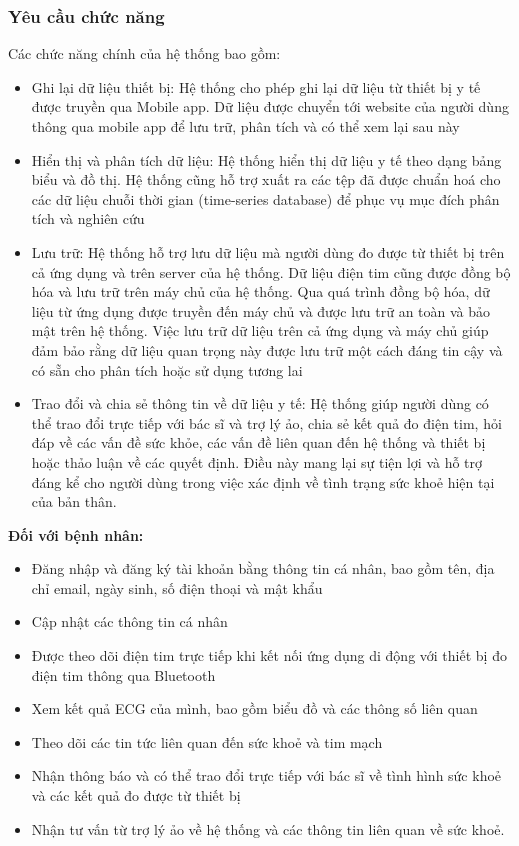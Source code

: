 \subsubsection{Yêu cầu chức năng}
Các chức năng chính của hệ thống bao gồm:
\begin{adjustwidth}{1.5em}{}
  \begin{itemize}
      \item Ghi lại dữ liệu thiết bị: Hệ thống cho phép ghi lại dữ liệu từ thiết bị y tế được truyền qua Mobile app. Dữ liệu được chuyển tới website của người dùng thông qua mobile app để lưu trữ, phân tích và có thể xem lại sau này
      \item Hiển thị và phân tích dữ liệu: Hệ thống hiển thị dữ liệu y tế theo dạng bảng biểu và đồ thị. Hệ thống cũng hỗ trợ xuất ra các tệp đã được chuẩn hoá cho các dữ liệu chuỗi thời gian (time-series database) để phục vụ mục đích phân tích và nghiên cứu
      \item Lưu trữ: Hệ thống hỗ trợ lưu dữ liệu mà người dùng đo được từ thiết bị trên cả ứng dụng và trên server của hệ thống. Dữ liệu điện tim cũng được đồng bộ hóa và lưu trữ trên máy chủ của hệ thống. Qua quá trình đồng bộ hóa, dữ liệu từ ứng dụng được truyền đến máy chủ và được lưu trữ an toàn và bảo mật trên hệ thống. Việc lưu trữ dữ liệu trên cả ứng dụng và máy chủ giúp đảm bảo rằng dữ liệu quan trọng này được lưu trữ một cách đáng tin cậy và có sẵn cho phân tích hoặc sử dụng tương lai
      \item Trao đổi và chia sẻ thông tin về dữ liệu y tế: Hệ thống giúp người dùng có thể trao đổi trực tiếp với bác sĩ và trợ lý ảo, chia sẻ kết quả đo điện tim, hỏi đáp về các vấn đề sức khỏe, các vấn đề liên quan đến hệ thống và thiết bị hoặc thảo luận về các quyết định. Điều này mang lại sự tiện lợi và hỗ trợ đáng kể cho người dùng trong việc xác định về tình trạng sức khoẻ hiện tại của bản thân.
      

  \end{itemize}
\end{adjustwidth}
\textbf{Đối với bệnh nhân:}
\begin{adjustwidth}{1.5em}{}
\begin{itemize}
    \item Đăng nhập và đăng ký tài khoản bằng thông tin cá nhân, bao gồm tên, địa chỉ email, ngày sinh, số điện thoại và mật khẩu
    \item Cập nhật các thông tin cá nhân
    \item Được theo dõi điện tim trực tiếp khi kết nối ứng dụng di động với thiết bị đo điện tim thông qua Bluetooth
    \item Xem kết quả ECG của mình, bao gồm biểu đồ và các thông số liên quan
    \item Theo dõi các tin tức liên quan đến sức khoẻ và tim mạch
    \item Nhận thông báo và có thể trao đổi trực tiếp với bác sĩ về tình hình sức khoẻ và các kết quả đo được từ thiết bị
    \item Nhận tư vấn từ trợ lý ảo về hệ thống và các thông tin liên quan về sức khoẻ.
\end{itemize}
\end{adjustwidth}
